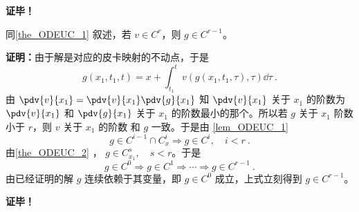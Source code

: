 \textbf{证毕！}
\begin{theorem}{}\label{the_ODEUC_2}
同\autoref{the_ODEUC_1} 叙述，若 $v\in C^r $，则 $g\in C^{r-1}$。
\end{theorem}
\textbf{证明：}由于解是对应的皮卡映射的不动点，于是
\begin{equation}
g(x_1,t_1,t)=x+\int_{t_1}^tv(g(x_1,t_1,\tau),\tau)\dd\tau~.
\end{equation}
由 $\pdv{v}{x_1}=\pdv{v}{x_1}\pdv{g}{x_1}$ 知 $\pdv{v}{x_1}$ 关于 $x_1$ 的阶数为 $\pdv{v}{x_1}$ 和 $\pdv{g}{x_1}$ 关于 $x_1$ 的阶数最小的那个。所以若 $g$ 关于 $x_1$ 阶数小于 $r$，则 $v$ 关于 $x_1$ 的阶数 和 $g$ 一致。于是由  \autoref{lem_ODEUC_1} 
\begin{equation} 
g\in C^{i-1}\cap C_x^{i}\Rightarrow g\in C^i,\quad i<r~.
\end{equation}
由\autoref{the_ODEUC_2} ， $g\in C_{x_1}^s,\quad s<r$。于是
\begin{equation}
g\in C^0\Rightarrow g\in C^1\Rightarrow\cdots\Rightarrow g\in C^{r-1}~.
\end{equation}
由已经证明的解 $g$ 连续依赖于其变量，即 $g\in C^0$ 成立，上式立刻得到 $g\in C^{r-1}$。

\textbf{证毕！}